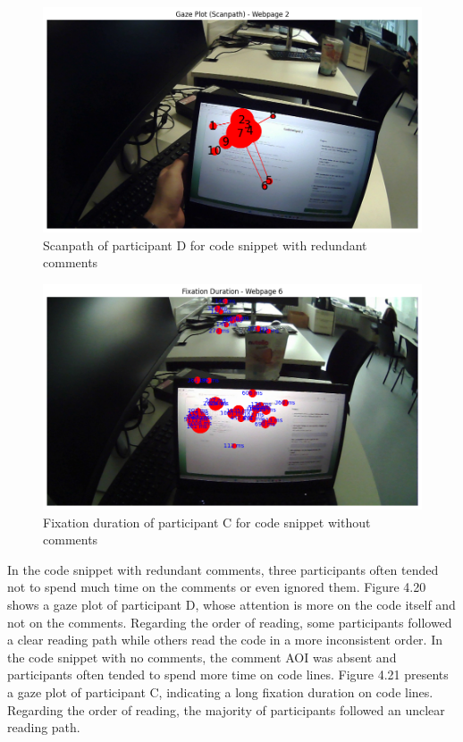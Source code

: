 \begin{figure} [H]
  \centering
  \includegraphics[scale=0.6]{figures/redun-com.png}
  \caption{Scanpath of  participant D for code snippet with redundant comments}
  \label{fig:AnhangsChor}
\end{figure}


\begin{figure} [H]
  \centering
  \includegraphics[scale=0.6]{figures/0-com.png}
  \caption{Fixation duration of  participant C for code snippet without comments}
  \label{fig:AnhangsChor}
\end{figure}


In the code snippet with redundant comments, three participants often tended not to spend much time on the comments or even ignored them. Figure 4.20  shows a gaze plot of participant D, whose attention  is more on the code itself and not on the comments. Regarding the order of reading, some participants followed a clear reading path while others read the code in a more inconsistent order.  In the code snippet with no comments, the comment AOI was absent and participants often tended to spend more time on code lines. Figure 4.21 presents a gaze plot of participant C, indicating a long fixation duration on code lines.    Regarding the order of reading, the majority of participants followed an unclear reading path.



